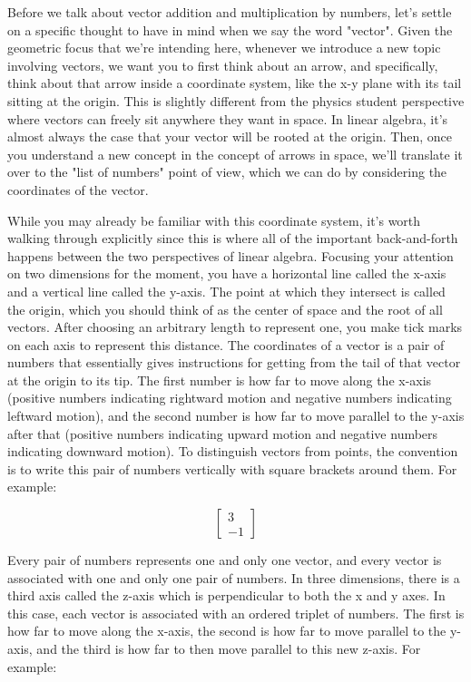 Before we talk about vector addition and multiplication by numbers, let's settle
on a specific thought to have in mind when we say the word "vector". Given the
geometric focus that we're intending here, whenever we introduce a new topic
involving vectors, we want you to first think about an arrow, and specifically,
think about that arrow inside a coordinate system, like the x-y plane with its
tail sitting at the origin. This is slightly different from the physics student
perspective where vectors can freely sit anywhere they want in space. In linear
algebra, it's almost always the case that your vector will be rooted at the
origin. Then, once you understand a new concept in the concept of arrows in
space, we'll translate it over to the "list of numbers" point of view, which we
can do by considering the coordinates of the vector.

While you may already be familiar with this coordinate system, it's worth
walking through explicitly since this is where all of the important
back-and-forth happens between the two perspectives of linear algebra. Focusing
your attention on two dimensions for the moment, you have a horizontal line
called the x-axis and a vertical line called the y-axis. The point at which they
intersect is called the origin, which you should think of as the center of
space and the root of all vectors. After choosing an arbitrary length to
represent one, you make tick marks on each axis to represent this distance. The
coordinates of a vector is a pair of numbers that essentially gives instructions
for getting from the tail of that vector at the origin to its tip. The first
number is how far to move along the x-axis (positive numbers indicating
rightward motion and negative numbers indicating leftward motion), and the
second number is how far to move parallel to the y-axis after that (positive
numbers indicating upward motion and negative numbers indicating downward
motion). To distinguish vectors from points, the convention is to write this
pair of numbers vertically with square brackets around them. For example:

\begin{equation*}
  \begin{bmatrix}
    3 \\
    -1
  \end{bmatrix}
\end{equation*}

Every pair of numbers represents one and only one vector, and every vector is
associated with one and only one pair of numbers. In three dimensions, there is
a third axis called the z-axis which is perpendicular to both the x and y axes.
In this case, each vector is associated with an ordered triplet of numbers. The
first is how far to move along the x-axis, the second is how far to move
parallel to the y-axis, and the third is how far to then move parallel to this
new z-axis. For example:

